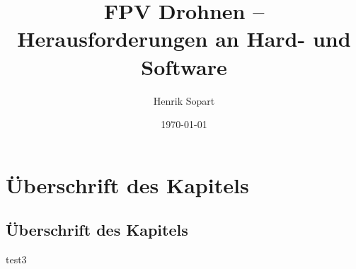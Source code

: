 \documentclass[a4paper,11pt]{scrartcl}
\title{FPV Drohnen – Herausforderungen an Hard- und Software}
\author{Henrik Sopart}
\date{\today}
\begin{document}
\maketitle
\newpage
\tableofcontents
\newpage
\section[Überschrift für das Inhaltsverzeichnis]{Überschrift des Kapitels}
\subsection[Überschrift für das Inhaltsverzeichnis]{Überschrift des Kapitels}

test3
\end{document}
